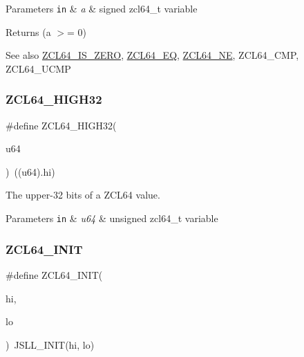 \begin{DoxyParams}[1]{Parameters}
\mbox{\tt in}  & {\em a} & signed zcl64\+\_\+t variable\\
\hline
\end{DoxyParams}
\begin{DoxyReturn}{Returns}
(a $>$= 0)
\end{DoxyReturn}
\begin{DoxySeeAlso}{See also}
\hyperlink{group__zcl__64_gad0e4c484d689dee3c5f1302fc80aef3e}{Z\+C\+L64\+\_\+\+I\+S\+\_\+\+Z\+E\+RO}, \hyperlink{group__zcl__64_ga329900843c1e59c30b4bdff95ee594bd}{Z\+C\+L64\+\_\+\+EQ}, \hyperlink{group__zcl__64_gaffa76b2bdfb8bc021db06efe331a2e5f}{Z\+C\+L64\+\_\+\+NE}, Z\+C\+L64\+\_\+\+C\+MP, Z\+C\+L64\+\_\+\+U\+C\+MP 
\end{DoxySeeAlso}
\mbox{\label{group__zcl__64_ga6a24898481f0fe419858c8b51cafda3e}} 
\subsubsection{\texorpdfstring{Z\+C\+L64\+\_\+\+H\+I\+G\+H32}{ZCL64\_HIGH32}}
{\footnotesize\ttfamily \#define Z\+C\+L64\+\_\+\+H\+I\+G\+H32(\begin{DoxyParamCaption}\item[{}]{u64 }\end{DoxyParamCaption})~((u64).hi)}



The upper-\/32 bits of a Z\+C\+L64 value. 


\begin{DoxyParams}[1]{Parameters}
\mbox{\tt in}  & {\em u64} & unsigned zcl64\+\_\+t variable \\
\hline
\end{DoxyParams}
\mbox{\label{group__zcl__64_ga8e855e53988a32f4428ceacce4f9870c}} 
\subsubsection{\texorpdfstring{Z\+C\+L64\+\_\+\+I\+N\+IT}{ZCL64\_INIT}}
{\footnotesize\ttfamily \#define Z\+C\+L64\+\_\+\+I\+N\+IT(\begin{DoxyParamCaption}\item[{}]{hi,  }\item[{}]{lo }\end{DoxyParamCaption})~J\+S\+L\+L\+\_\+\+I\+N\+IT(hi, lo)}



